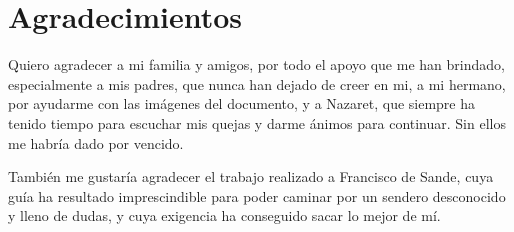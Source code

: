 \chapter*{Agradecimientos}
%

\bigskip

Quiero agradecer a mi familia y amigos, por todo el apoyo que me han brindado,
especialmente a mis padres, que nunca han dejado de creer en mi, a mi hermano,
por ayudarme con las imágenes del documento, y a Nazaret, que
siempre ha tenido tiempo para escuchar mis quejas y darme ánimos para continuar.
Sin ellos me habría dado por vencido.


También me gustaría agradecer el trabajo realizado a Francisco de Sande, cuya
guía ha resultado imprescindible para poder caminar por un sendero desconocido y
lleno de dudas, y cuya exigencia ha conseguido sacar lo mejor de mí.
